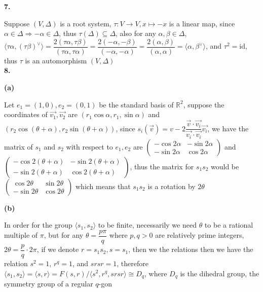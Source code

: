 \documentclass[10pt]{article}
\newcommand{\<}[1]{\langle #1 \rangle}
\begin{document}
\textbf{7.} \par
Suppose $(V,\Delta)$ is a root system, $\tau:V\to V,x\mapsto-x$ is a linear map, since $\alpha\in\Delta\Rightarrow-\alpha\in\Delta$, thus $\tau(\Delta)\subseteq\Delta$, also for any $\alpha,\beta\in\Delta$, $\langle\tau\alpha,(\tau\beta)^\vee\rangle=\dfrac{2(\tau\alpha,\tau\beta)}{(\tau\alpha,\tau\alpha)}=\dfrac{2(-\alpha,-\beta)}{(-\alpha,-\alpha)}=\dfrac{2(\alpha,\beta)}{(\alpha,\alpha)}=\langle\alpha,\beta^\vee\rangle$, and $\tau^2=\mathrm{id}$, thus $\tau$ is an automorphism $(V,\Delta)$ \\
\textbf{8.} \par
\textbf{(a)} \par
Let $e_1=(1,0),e_2=(0,1)$ be the standard basis of $\mathbb R^2$, suppose the coordinates of $\vec{v_1},\vec{v_2}$ are $(r_1\cos\alpha,r_1,\sin\alpha)$ and $(r_2\cos(\theta+\alpha),r_2\sin(\theta+\alpha))$, since $s_i(\vec{v})=v-2\dfrac{\vec{v}\cdot\vec{v_i}}{\vec{v_i}\cdot \vec{v_i}}\vec{v_i}$, we have the matrix of $s_1$ and $s_2$ with respect to $e_1,e_2$ are $\begin{pmatrix}
-\cos2\alpha&-\sin2\alpha \\
-\sin2\alpha&\cos2\alpha
\end{pmatrix}$ and $\begin{pmatrix}
-\cos2(\theta+\alpha)&-\sin2(\theta+\alpha) \\
-\sin2(\theta+\alpha)&\cos2(\theta+\alpha)
\end{pmatrix}$, thus the matrix for $s_1s_2$ would be $\begin{pmatrix}
\cos2\theta&\sin2\theta \\
-\sin2\theta&\cos2\theta
\end{pmatrix}$ which means that $s_1s_2$ is a rotation by $2\theta$ \par
\textbf{(b)} \par
In order for the group $\langle s_1,s_2\rangle$ to be finite, necessarily we need $\theta$ to be a rational multiple of $\pi$, but for any $\theta=\dfrac{p\pi}{q}$ where $p,q>0$ are relatively prime integers, $2\theta=\dfrac{p}{q}\cdot 2\pi$, if we denote $r=s_1s_2,s=s_1$, then we the relations then we have the relation $s^2=1$, $r^q=1$, and $srsr=1$, therefore $\langle s_1,s_2\rangle=\langle s,r\rangle=F(s,r)/\langle s^2,r^q,srsr\rangle\cong D_{q}$, where $D_q$ is the dihedral group, the symmetry group of a regular $q$-gon \par
\end{document}
